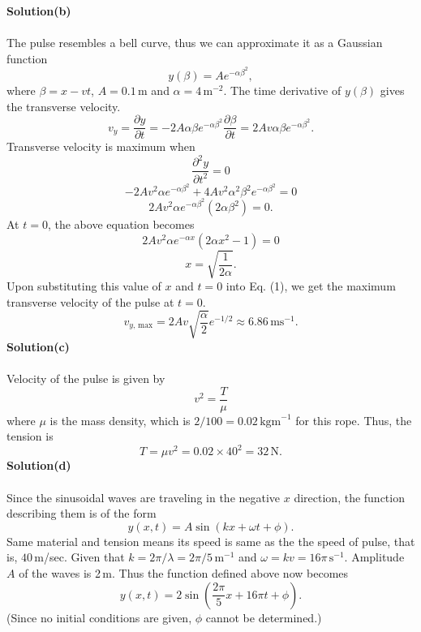 \documentclass[12pt,a4paper]{article}
\begin{document}
\newpage
\textbf{Solution(b)}
\\
\\The pulse resembles a bell curve, thus we can approximate it as a Gaussian function
\[y(\beta)=Ae^{-\alpha\beta^2},\]
where $\beta=x-vt$, $A=0.1\,$m and $\alpha=4\,\text{m}^{-2}$. The time derivative of $y(\beta)$ gives the transverse velocity.
\begin{equation}
    v_y=\frac{\partial y}{\partial t}=-2A\alpha\beta e^{-\alpha\beta^2}\frac{\partial\beta}{\partial t}=2Av\alpha\beta e^{-\alpha\beta^2}.
\end{equation}
Transverse velocity is maximum when
\[\frac{\partial^2y}{\partial t^2}=0\]
\[-2Av^2\alpha e^{-\alpha\beta^2}+4Av^2\alpha^2\beta^2e^{-\alpha\beta^2}=0\]
\[2Av^2\alpha e^{-\alpha\beta^2}\left(2\alpha\beta^2\right)=0.\]
At $t=0$, the above equation becomes
\[2Av^2\alpha e^{-\alpha x}\left(2\alpha x^2-1\right)=0\]
\[x=\sqrt{\frac{1}{2\alpha}}.\]
Upon substituting this value of $x$ and $t=0$ into Eq. (1), we get the maximum transverse velocity of the pulse at $t=0$.
\[v_{y\text{, max}}=2Av\sqrt{\frac{\alpha}{2}}e^{-1/2}\approx6.86\,\text{ms}^{-1}.\]
\textbf{Solution(c)}
\\
\\Velocity of the pulse is given by 
\[v^2=\frac{T}{\mu}\]
where $\mu$ is the mass density, which is $2/100=0.02\,\text{kgm}^{-1}$ for this rope. Thus, the tension is
\[T=\mu v^2=0.02\times40^2=32\,\text{N}.\]
\textbf{Solution(d)}
\\
\\Since the sinusoidal waves are traveling in the negative $x$ direction, the function describing them is of the form
\[y(x,t)=A\sin(kx+\omega t+\phi).\]
Same material and tension means its speed is same as the the speed of pulse, that is, $40\,$m/sec. Given that $k=2\pi/\lambda=2\pi/5\,\text{m}^{-1}$ and $\omega=kv=16\pi\,\text{s}^{-1}$. Amplitude $A$ of the waves is 2\,m. Thus the function defined above now becomes
\[y(x,t)=2\sin\left(\frac{2\pi}{5}x+16\pi t+\phi\right).\]
(Since no initial conditions are given, $\phi$ cannot be determined.)
\end{document}
